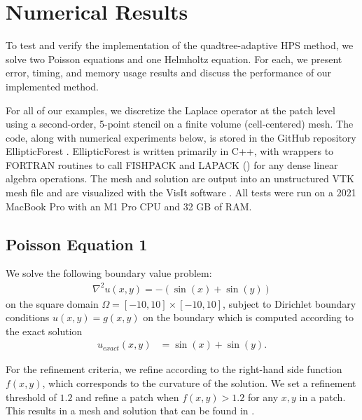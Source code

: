 \section{Numerical Results}
\label{sec:results}

To test and verify the implementation of the quadtree-adaptive HPS method, we solve two Poisson equations and one Helmholtz equation. For each, we present error, timing, and memory usage results and discuss the performance of our implemented method.

For all of our examples, we discretize the Laplace operator at the patch level using a second-order, 5-point stencil on a finite volume (cell-centered) mesh. The code, along with numerical experiments below, is stored in the GitHub repository EllipticForest \citep{chipman2023elliptic}. EllipticForest is written primarily in C++, with wrappers to FORTRAN routines to call FISHPACK and LAPACK (\citep{anderson1999lapack}) for any dense linear algebra operations. The mesh and solution are output into an unstructured VTK mesh file \citep{vtkBook} and are visualized with the VisIt software \citep{HPV:VisIt}. All tests were run on a 2021 MacBook Pro with an M1 Pro CPU and 32 GB of RAM.

\subsection{Poisson Equation 1}
\label{sub:example_one}

We solve the following boundary value problem:
\begin{align}
    \nabla^2 u(x,y) = -(\sin(x) + \sin(y))
\end{align}
on the square domain $\Omega = [-10, 10] \times [-10, 10]$, subject to Dirichlet boundary conditions $u(x,y) = g(x,y)$ on the boundary which is computed according to the exact solution
\begin{align}
    u_{exact}(x,y) &= \sin(x) + \sin(y).
\end{align}

For the refinement criteria, we refine according to the right-hand side function $f(x,y)$, which corresponds to the curvature of the solution. We set a refinement threshold of $1.2$ and refine a patch when $f(x,y) > 1.2$ for any $x,y$ in a patch. This results in a mesh and solution that can be found in .

